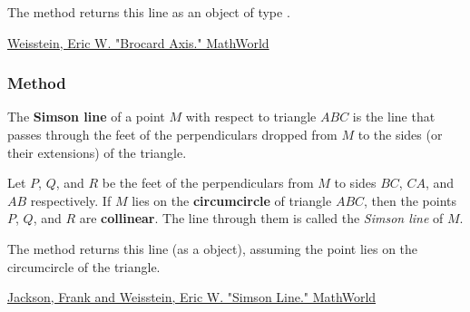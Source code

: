 \noindent
The method  returns this line as an object of type .
\begin{flushright}
\small
\href{https://mathworld.wolfram.com/BrocardAxis.html}{Weisstein, Eric W. "Brocard Axis." MathWorld}
\end{flushright}

\vspace{1em}

\subsubsection{Method } %
\label{ssub:method_triangle_simson__line}

The \textbf{Simson line} of a point $M$ with respect to triangle $ABC$ is the line that passes through the feet of the perpendiculars dropped from $M$ to the sides (or their extensions) of the triangle.

\medskip
\noindent
Let $P$, $Q$, and $R$ be the feet of the perpendiculars from $M$ to sides $BC$, $CA$, and $AB$ respectively. If $M$ lies on the \textbf{circumcircle} of triangle $ABC$, then the points $P$, $Q$, and $R$ are \textbf{collinear}. The line through them is called the \emph{Simson line} of $M$.

\medskip
\noindent
The method  returns this line (as a  object), assuming the point  lies on the circumcircle of the triangle.
\begin{flushright}
\small
\href{https://mathworld.wolfram.com/SimsonLine.html}{Jackson, Frank and Weisstein, Eric W. "Simson Line." MathWorld}
\end{flushright}

\vspace{1em}
\begin{tkzexample}[vbox]
\begin{center}
\end{center}
\end{tkzexample}


